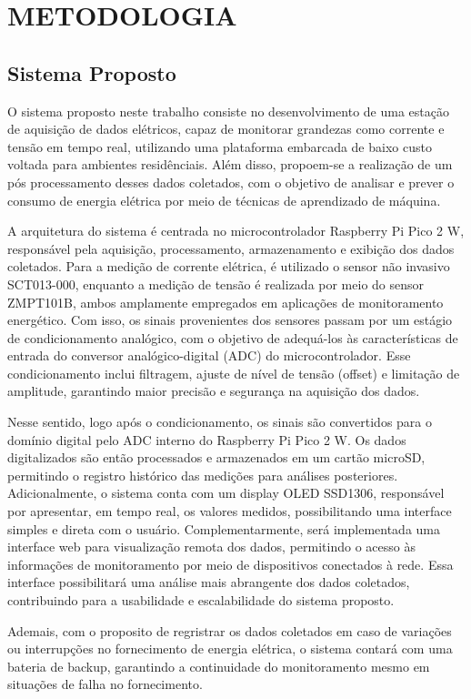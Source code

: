 \chapter{METODOLOGIA}{}
\section{Sistema Proposto}

O sistema proposto neste trabalho consiste no desenvolvimento de uma estação de aquisição de dados elétricos, capaz de monitorar grandezas como corrente e tensão em tempo real, utilizando uma plataforma embarcada de baixo custo voltada para ambientes residênciais. Além disso, propoem-se a realização de um pós processamento desses dados coletados, com o objetivo de analisar e prever o consumo de energia elétrica por meio de técnicas de aprendizado de máquina.

A arquitetura do sistema é centrada no microcontrolador Raspberry Pi Pico 2 W, responsável pela aquisição, processamento, armazenamento e exibição dos dados coletados. Para a medição de corrente elétrica, é utilizado o sensor não invasivo SCT013-000, enquanto a medição de tensão é realizada por meio do sensor ZMPT101B, ambos amplamente empregados em aplicações de monitoramento energético. Com isso, os sinais provenientes dos sensores passam por um estágio de condicionamento analógico, com o objetivo de adequá-los às características de entrada do conversor analógico-digital (ADC) do microcontrolador. Esse condicionamento inclui filtragem, ajuste de nível de tensão (offset) e limitação de amplitude, garantindo maior precisão e segurança na aquisição dos dados.

Nesse sentido, logo após o condicionamento, os sinais são convertidos para o domínio digital pelo ADC interno do Raspberry Pi Pico 2 W. Os dados digitalizados são então processados e armazenados em um cartão microSD, permitindo o registro histórico das medições para análises posteriores. Adicionalmente, o sistema conta com um display OLED SSD1306, responsável por apresentar, em tempo real, os valores medidos, possibilitando uma interface simples e direta com o usuário. Complementarmente, será implementada uma interface web para visualização remota dos dados, permitindo o acesso às informações de monitoramento por meio de dispositivos conectados à rede. Essa interface possibilitará uma análise mais abrangente dos dados coletados, contribuindo para a usabilidade e escalabilidade do sistema proposto.

Ademais, com o proposito de regristrar os dados coletados em caso de variações ou interrupções no fornecimento de energia elétrica, o sistema contará com uma bateria de backup, garantindo a continuidade do monitoramento mesmo em situações de falha no fornecimento.

